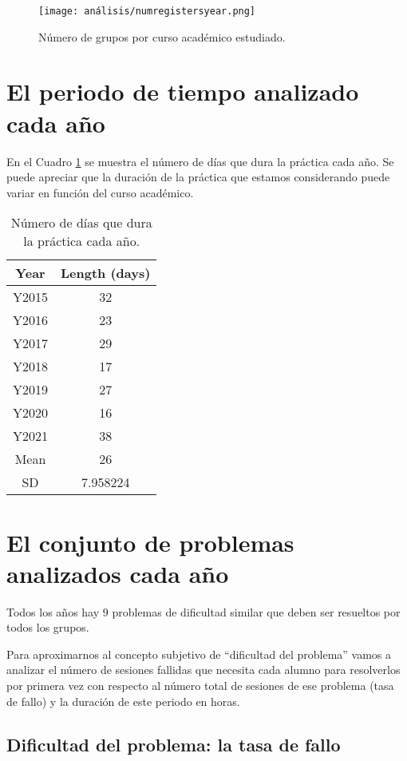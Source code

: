 \begin{figure}[H]
    \centering
    \texttt{[image: análisis/numregistersyear.png]}
    \caption{Número de grupos por curso académico estudiado.}
    \label{fig:groupsperyear}
\end{figure}

\section{El periodo de tiempo analizado cada año}

En el Cuadro \ref{tab:days} se muestra el número de días que dura la práctica cada año. Se puede apreciar que la duración de la práctica que estamos considerando puede variar en función del curso académico.

\begin{table}[H]
\centering
\caption{Número de días que dura la práctica cada año.}
\label{tab:days}
\begin{tabular}{cc}
\hline
\textbf{Year}  & \textbf{Length (days)}  \\ \hline
Y2015 & 32 \\
Y2016 & 23 \\
Y2017 & 29 \\
Y2018 & 17 \\
Y2019 & 27 \\
Y2020 & 16 \\
Y2021 & 38 \\ \hline
Mean & 26 \\
SD & 7.958224 \\ \hline
\end{tabular}
\end{table}

\section{El conjunto de problemas analizados cada año}

Todos los años hay $9$ problemas de dificultad similar que deben ser resueltos por todos los grupos.

Para aproximarnos al concepto subjetivo de ``dificultad del problema'' vamos a analizar el número de sesiones fallidas que necesita cada alumno para resolverlos por primera vez con respecto al número total de sesiones de ese problema (tasa de fallo) y la duración de este periodo en horas.

\subsection{Dificultad del problema: la tasa de fallo}

